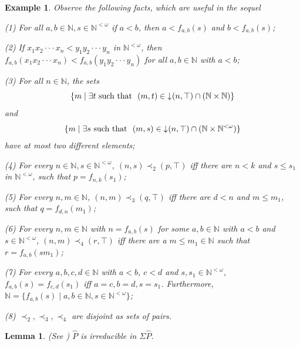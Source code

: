 \documentclass[preprint,12pt]{elsarticle}
\numberwithin{equation}{section}
\newtheorem{lemma}[theorem]{Lemma}
\newtheorem{example}[theorem]{Example}
\newcommand{\dn}{\mathord{\downarrow}\hspace{0.05em}}
\begin{document}
\begin{example}
{Observe the following facts, which are useful in the sequel

(1) For all $a,b\in\mathbb{N},s\in\mathbb{N}^{<\omega}$ if $a<b$, then $a<f_{a,b}(s)$ and $b<f_{a,b}(s)$;

(2) If $x_{1}x_{2}\cdot\cdot\cdot x_{n}< y_{1}y_{2}\cdot\cdot\cdot y_{n}$ in $\mathbb{N}^{<\omega}$, then $f_{a,b}(x_{1}x_{2}\cdot\cdot\cdot x_{n})<f_{a,b}(y_{1}y_{2}\cdot\cdot\cdot y_{n})$ for all $a,b\in \mathbb{N}$ with $a<b$;

(3) For all $n\in\mathbb{N}$, the sets $$\{m\mid \exists t \ \mbox{such that}\ \ (m,t)\in\dn(n,\top)\cap(\mathbb{N}\times\mathbb{N})\}$$ and $$\{m\mid \exists s\ \mbox{such that}\ \ (m,s)\in\dn(n,\top)\cap(\mathbb{N}\times\mathbb{N}^{<\omega})\}$$ have at most two different elements;

(4) For every $n\in\mathbb{N},s\in\mathbb{N}^{<\omega}$, $(n,s)\prec_{2}(p,\top)$ iff there are $n<k$ and $s\leq s_{1}$ in $\mathbb{N}^{<\omega}$, such that  $p=f_{n,k}(s_{1})$;

(5) For every $n,m\in\mathbb{N}$, $(n,m)\prec_{3}(q,\top)$ iff there are $d<n$ and $m\leq m_{1}$, such that $q=f_{d,n}(m_{1})$;

(6) For every $n,m\in\mathbb{N}$ with $n=f_{a,b}(s)$ for some $a,b\in\mathbb{N}$ with $a<b$ and $s\in\mathbb{N}^{<\omega}$, $(n,m)\prec_{4}(r,\top)$ iff there are a $m\leq m_{1}\in\mathbb{N}$ such that $r=f_{a,b}(sm_{1})$;

(7) For every $a,b,c,d\in\mathbb{N}$ with $a<b$, $c<d$ and $s,s_{1}\in\mathbb{N}^{<\omega}$, $f_{a,b}(s)=f_{c,d}(s_{1})$ iff $a=c,b=d,s=s_{1}$. Furthermore, $\mathbb{N}=\{f_{a,b}(s)\mid a,b\in\mathbb{N}, s\in\mathbb{N}^{<\omega}\}$;

(8) $\prec_{2},\prec_{3},\prec_{4}$ are disjoint as sets of pairs.}
\end{example}

\begin{lemma} (See \cite{AB75}) $\widehat{P}$ is irreducible in $\Sigma\widehat{P}$.

\end{lemma}
\end{document}

